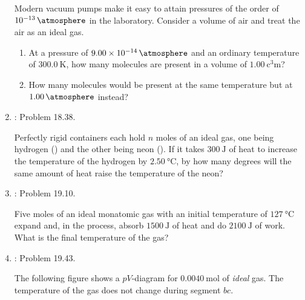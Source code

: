 \documentclass[../psets.tex]{subfiles}
\begin{document}
\begin{enumerate}[label={\arabic*)}]
    Modern vacuum pumps make it easy to attain pressures of the order of $\SI{e-13}{\atmosphere}$ in the laboratory. Consider a volume of air and treat the air as an ideal gas.
    \begin{enumerate}
        \item At a pressure of $\SI{9.00e-14}{\atmosphere}$ and an ordinary temperature of $\SI{300.0}{\kelvin}$, how many molecules are present in a volume of $\SI{1.00}{\cubic\centi\meter}$?
        \item How many molecules would be present at the same temperature but at $\SI{1.00}{\atmosphere}$ instead?
    \end{enumerate}
    \item \textcite{bib:YoungFreedman}: Problem 18.38.\par
    Perfectly rigid containers each hold $n$ moles of an ideal gas, one being hydrogen () and the other being neon (). If it takes $\SI{300}{\joule}$ of heat to increase the temperature of the hydrogen by $\SI{2.50}{\celsius}$, by how many degrees will the same amount of heat raise the temperature of the neon?
    \item \textcite{bib:YoungFreedman}: Problem 19.10.\par
    Five moles of an ideal monatomic gas with an initial temperature of $\SI{127}{\celsius}$ expand and, in the process, absorb $\SI{1500}{\joule}$ of heat and do $\SI{2100}{\joule}$ of work. What is the final temperature of the gas?
    \item \textcite{bib:YoungFreedman}: Problem 19.43.\par
    The following figure shows a $pV$-diagram for $\SI{0.0040}{\mole}$ of \emph{ideal}  gas. The temperature of the gas does not change during segment $bc$.
    \begin{center}
\end{center}
\end{enumerate}
\end{document}
